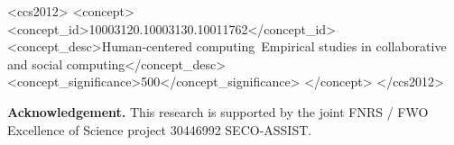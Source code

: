 \begin{CCSXML}
<ccs2012>
	<concept>
		<concept_id>10003120.10003130.10011762</concept_id>
		<concept_desc>Human-centered computing~Empirical studies in collaborative and social computing</concept_desc>
		<concept_significance>500</concept_significance>
	</concept>
</ccs2012>
\end{CCSXML}

	



\maketitle






\textbf{Acknowledgement.} This research is supported by the joint FNRS / FWO Excellence of Science project 30446992 SECO-ASSIST.

\newpage






